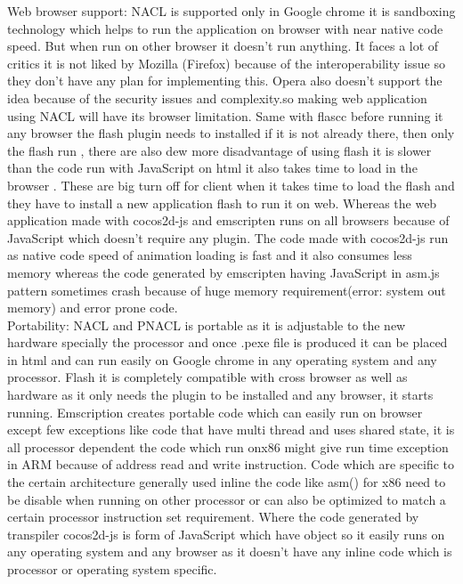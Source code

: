 \documentclass[23pt]{article}
\begin{document}
{Web browser support:  NACL is supported only in Google chrome  it is sandboxing technology which helps to run the application on browser with near native code speed. But when run on other browser it doesn’t run anything. It faces a lot of critics it is not liked by Mozilla (Firefox) because of the interoperability issue so they don’t have any plan for implementing this. Opera also doesn’t support the idea because of the security issues and complexity.so making web application using NACL will have its browser limitation. Same with flascc before running it any browser the flash plugin needs to installed if it is not already there, then  only the flash run , there are also dew more disadvantage of using flash it is slower than the code run with JavaScript on html it also takes time to load in the browser . These are big turn off for client when it takes time to load the flash and they have to install a new application flash to run it on web. Whereas the web application made with cocos2d-js and emscripten runs on all browsers because of JavaScript  which doesn’t require any plugin. The code made with cocos2d-js run as native code speed of animation loading is fast and it also consumes less memory whereas the code generated by emscripten having JavaScript in asm.js pattern sometimes crash because of huge memory requirement(error: system out memory)  and error prone code.\\
Portability: NACL and PNACL is portable as it is adjustable to the new hardware specially the processor and once .pexe file is produced it can be placed in html and can run easily on Google chrome in any operating system and any processor. Flash it is completely compatible with cross browser as well as hardware as it only needs the plugin to be installed and any browser, it starts running. Emscription creates portable code which can easily run on browser except few exceptions like code that have multi thread and uses shared state, it is all processor dependent the code which run onx86 might give run time exception in ARM because of address read and write instruction. Code which are specific to the certain architecture generally used inline the code like asm() for x86 need to be disable when running on other processor or can also be optimized to match a certain processor instruction set requirement. Where the code generated by transpiler cocos2d-js is form of JavaScript which have object so it easily runs on any operating system and any browser as it doesn’t have any inline code which is processor or operating system specific.\\ 
}
\end{document}
